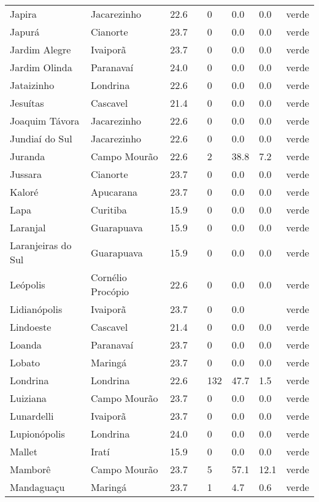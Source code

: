 \begin{longtable}{l|lllllll}
  Japira & Jacarezinho & 22.6 &  & 0 & 0.0 & 0.0 & verde \\ 
  Japurá & Cianorte & 23.7 &  & 0 & 0.0 & 0.0 & verde \\ 
  Jardim Alegre & Ivaiporã & 23.7 &  & 0 & 0.0 & 0.0 & verde \\ 
  Jardim Olinda & Paranavaí & 24.0 &  & 0 & 0.0 & 0.0 & verde \\ 
  Jataizinho & Londrina & 22.6 &  & 0 & 0.0 & 0.0 & verde \\ 
  Jesuítas & Cascavel & 21.4 &  & 0 & 0.0 & 0.0 & verde \\ 
  Joaquim Távora & Jacarezinho & 22.6 &  & 0 & 0.0 & 0.0 & verde \\ 
  Jundiaí do Sul & Jacarezinho & 22.6 &  & 0 & 0.0 & 0.0 & verde \\ 
  Juranda & Campo Mourão & 22.6 &  & 2 & 38.8 & 7.2 & verde \\ 
  Jussara & Cianorte & 23.7 &  & 0 & 0.0 & 0.0 & verde \\ 
  Kaloré & Apucarana & 23.7 &  & 0 & 0.0 & 0.0 & verde \\ 
  Lapa & Curitiba & 15.9 &  & 0 & 0.0 & 0.0 & verde \\ 
  Laranjal & Guarapuava & 15.9 &  & 0 & 0.0 & 0.0 & verde \\ 
  Laranjeiras do Sul & Guarapuava & 15.9 &  & 0 & 0.0 & 0.0 & verde \\ 
  Leópolis & Cornélio Procópio & 22.6 &  & 0 & 0.0 & 0.0 & verde \\ 
  Lidianópolis & Ivaiporã & 23.7 &  & 0 & 0.0 &  & verde \\ 
  Lindoeste & Cascavel & 21.4 &  & 0 & 0.0 & 0.0 & verde \\ 
  Loanda & Paranavaí & 23.7 &  & 0 & 0.0 & 0.0 & verde \\ 
  Lobato & Maringá & 23.7 &  & 0 & 0.0 & 0.0 & verde \\ 
  Londrina & Londrina & 22.6 &  & 132 & 47.7 & 1.5 & verde \\ 
  Luiziana & Campo Mourão & 23.7 &  & 0 & 0.0 & 0.0 & verde \\ 
  Lunardelli & Ivaiporã & 23.7 &  & 0 & 0.0 & 0.0 & verde \\ 
  Lupionópolis & Londrina & 24.0 &  & 0 & 0.0 & 0.0 & verde \\ 
  Mallet & Iratí & 15.9 &  & 0 & 0.0 & 0.0 & verde \\ 
  Mamborê & Campo Mourão & 23.7 &  & 5 & 57.1 & 12.1 & verde \\ 
  Mandaguaçu & Maringá & 23.7 &  & 1 & 4.7 & 0.6 & verde \\ 

\end{longtable}

